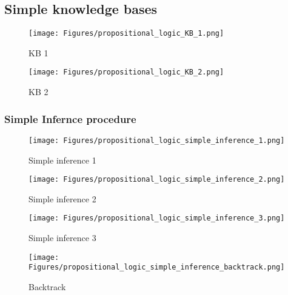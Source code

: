 \subsection{Simple knowledge bases}

\begin{figure}[H]
    \centering
    \texttt{[image: Figures/propositional\_logic\_KB\_1.png]}
    \caption{KB 1}
    \label{fig:KB1}
\end{figure}


\begin{figure}[H]
    \centering
    \texttt{[image: Figures/propositional\_logic\_KB\_2.png]}
    \caption{KB 2}
    \label{fig:KB2}
\end{figure}



















\subsubsection{Simple Infernce procedure}

\begin{figure}[H]
    \centering
    \texttt{[image: Figures/propositional\_logic\_simple\_inference\_1.png]}
    \caption{Simple inference 1}
    \label{fig:SI 1}
\end{figure}


\begin{figure}[H]
    \centering
    \texttt{[image: Figures/propositional\_logic\_simple\_inference\_2.png]}
    \caption{Simple inference 2}
    \label{fig:SI 2}
\end{figure}

\begin{figure}[H]
    \centering
    \texttt{[image: Figures/propositional\_logic\_simple\_inference\_3.png]}
    \caption{Simple inference 3}
    \label{fig:SI 3}
\end{figure}

\begin{figure}[H]
    \centering
    \texttt{[image: Figures/propositional\_logic\_simple\_inference\_backtrack.png]}
    \caption{Backtrack}
    \label{fig:SI backtrack}
\end{figure}



















